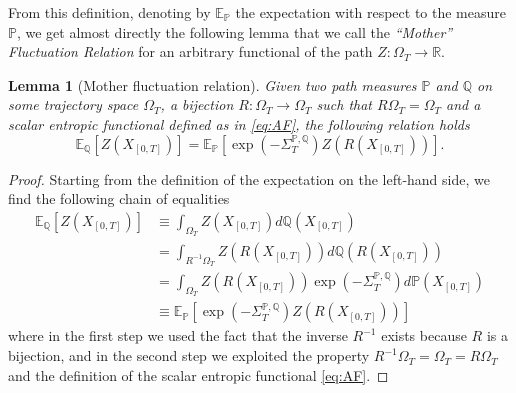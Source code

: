 \documentclass[a4paper,11pt]{article}
\numberwithin{equation}{section}
\newtheorem{lemma}[theorem]{Lemma}
\begin{document}
From this definition, denoting by $\mathbb{E}_{\mathbb{P}}$ the expectation with respect to the measure $\mathbb{P}$, we get almost directly the following lemma that we call the \emph{``Mother'' Fluctuation Relation} for an arbitrary functional of the path $Z : \Omega_T \to \mathbb{R}$.
\begin{lemma}[Mother fluctuation relation]\label{lem:mother}
Given two path measures $\mathbb{P}$ and $\mathbb{Q}$ on some trajectory space $\Omega_T$, a bijection $R : \Omega_T \to \Omega_T$ such that $R \Omega_T = \Omega_T$ and a scalar entropic functional defined as in \eqref{eq:AF}, the following relation holds 
   \begin{equation}
\mathbb{E}_{\mathbb{Q}}\left[Z\left(X_{\left[0,T\right]}\right)\right]=\ensuremath{\mathbb{E}_{\mathbb{P}}\left[\exp\left(-\varSigma_{T}^{\mathbb{P},\mathbb{Q}}\right)Z\left(R\left(X_{\left[0,T\right]}\right)\right)\right]}.\label{eq:MRF}
\end{equation} 
\end{lemma}
\begin{proof}
Starting from the definition of the expectation on the left-hand side, we find the following chain of equalities
  \begin{align}
  \mathbb{E}_{\mathbb{Q}}\left[Z\left(X_{\left[0,T\right]}\right)\right] &\equiv \int_{\Omega_T} Z\left(X_{\left[0,T\right]}\right) d\mathbb{Q}\left(X_{\left[0,T\right]}\right)  \nonumber \\
  &=  \int_{R^{-1}\Omega_T} Z\left( R \left( X_{\left[0,T\right]}\right) \right) d\mathbb{Q}\left( R\left( X_{\left[0,T\right]}\right)\right)  \nonumber \\
  &=  \int_{\Omega_T} Z\left( R \left( X_{\left[0,T\right]}\right) \right) \exp\left(-\varSigma_{T}^{\mathbb{P},\mathbb{Q}}\right) d\mathbb{P}\left(X_{\left[0,T\right]}\right) \nonumber \\
  &\equiv \mathbb{E}_{\mathbb{P}}\left[\exp\left(-\varSigma_{T}^{\mathbb{P},\mathbb{Q}}\right) Z\left(R\left(X_{\left[0,T\right]}\right)\right)\right]
  \end{align}
where in the first step we used the fact that the inverse $R^{-1}$ exists because $R$ is a bijection, and in the second step we exploited the property $R^{-1}\Omega_T = \Omega_T = R \Omega_T$ and the definition of the scalar entropic functional \eqref{eq:AF}.   
\end{proof}
\end{document}
